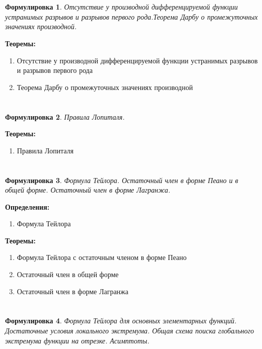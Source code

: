 \documentclass[a4paper]{article}
\theoremstyle{plain}
\newtheorem*{st}{Формулировка}
\theoremstyle{definition}
\theoremstyle{remark}
\begin{document}
\section{}
\begin{st}
    Отсутствие у производной дифференцируемой функции устранимых разрывов и разрывов первого рода.Теорема Дарбу о промежуточных значениях производной.
\end{st}

\textbf{Теоремы:}
\begin{enumerate}
    \item Отсутствие у производной дифференцируемой функции устранимых разрывов и разрывов первого рода
    \item Теорема Дарбу о промежуточных значениях производной
\end{enumerate}


\section{}
\begin{st}
    Правила Лопиталя.
\end{st}

\textbf{Теоремы:}
\begin{enumerate}
    \item Правила Лопиталя
\end{enumerate}


\section{}
\begin{st}
    Формула Тейлора. Остаточный член в форме Пеано и в общей форме. Остаточный член в форме Лагранжа.
\end{st}

\textbf{Определения:}
\begin{enumerate}
    \item Формула Тейлора
\end{enumerate}

\textbf{Теоремы:}
\begin{enumerate}
    \item Формула Тейлора с остаточным членом в форме Пеано
    \item Остаточный член в общей форме
    \item Остаточный член в форме Лагранжа
\end{enumerate}


\section{}
\begin{st}
    Формула Тейлора для основных элементарных функций. Достаточные условия локального экстремума. Общая схема поиска глобального экстремума функции на отрезке. Асимптоты.
\end{st}
\end{document}
